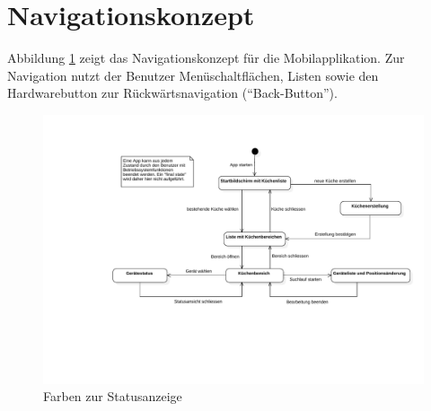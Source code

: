 \section{Navigationskonzept}
\label{sec:Navigationskonzept}

Abbildung \ref{abb:navigationConcept} zeigt das Navigationskonzept für die Mobilapplikation. Zur Navigation nutzt der Benutzer Menüschaltflächen, Listen sowie den Hardwarebutton zur Rückwärtsnavigation (\enquote{Back-Button}).

\begin{figure}[H]
    \begin{center}
        \includegraphics[trim=150 170 0 0,clip,scale=0.6]{uiux/res/navigation}
    \end{center}
    \caption{Farben zur Statusanzeige}
    \label{abb:navigationConcept}
\end{figure}

\vspace{120pt}